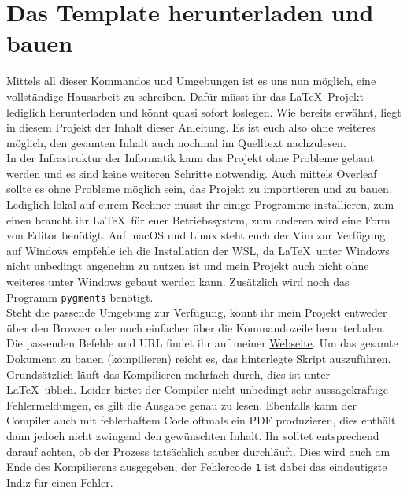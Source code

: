 \section{Das Template herunterladen und bauen}

Mittels all dieser Kommandos und Umgebungen ist es uns nun möglich, eine
vollständige Hausarbeit zu schreiben. Dafür müsst ihr das \LaTeX~Projekt 
lediglich herunterladen und könnt quasi sofort loslegen. Wie bereits erwähnt,
liegt in diesem Projekt der Inhalt dieser Anleitung. Es ist euch also ohne 
weiteres möglich, den gesamten Inhalt auch nochmal im Quelltext nachzulesen.\\
In der Infrastruktur der Informatik kann das Projekt ohne Probleme gebaut 
werden und es sind keine weiteren Schritte notwendig. Auch mittels Overleaf
sollte es ohne Probleme möglich sein, das Projekt zu importieren und zu bauen. 
Lediglich lokal auf eurem Rechner müsst ihr einige Programme installieren, zum 
einen braucht ihr \LaTeX~für euer Betriebssystem, zum anderen wird eine Form 
von Editor benötigt. Auf macOS und Linux steht euch der Vim zur Verfügung, auf
Windows empfehle ich die Installation der WSL, da \LaTeX~unter Windows nicht 
unbedingt angenehm zu nutzen ist und mein Projekt auch nicht ohne weiteres unter
Windows gebaut werden kann. Zusätzlich wird noch das Programm \texttt{pygments} 
benötigt.\\
Steht die passende Umgebung zur Verfügung, könnt ihr mein Projekt entweder über 
den Browser oder noch einfacher über die Kommandozeile herunterladen. Die passenden
Befehle und URL findet ihr auf meiner 
\href{https://informatik.hs-bremerhaven.de/flignitz/latex.html}{Webseite}.
\pagebreak
Um das gesamte Dokument zu bauen (kompilieren) reicht es, das hinterlegte Skript
auszuführen. Grundsätzlich läuft das Kompilieren mehrfach durch, dies ist unter 
\LaTeX~üblich. Leider bietet der Compiler nicht unbedingt sehr aussagekräftige 
Fehlermeldungen, es gilt die Ausgabe genau zu lesen. Ebenfalls kann der Compiler auch
mit fehlerhaftem Code oftmals ein PDF produzieren, dies enthält dann jedoch nicht 
zwingend den gewünschten Inhalt. Ihr solltet entsprechend darauf achten, ob der 
Prozess tatsächlich sauber durchläuft. Dies wird auch am Ende des Kompilierens 
ausgegeben, der Fehlercode \texttt{1} ist dabei das eindeutigste Indiz für einen
Fehler.
